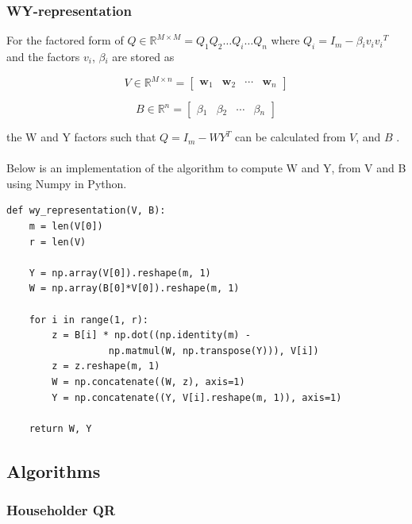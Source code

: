 \documentclass{article}
\begin{document}
\subsubsection{WY-representation}

For the factored form of $Q \in \mathbb{R}^{M \times M} = {Q_1}{Q_2}{\dots}{Q_i}{\dots}{Q_n}$ where $Q_i = {I_m} - {\beta{}_i}{v_i}{v_i}^T$ and the factors ${v_i}$, ${\beta{}_i}$ are stored as  

\begin{equation}
V \in \mathbb{R}^{M \times n} =
\begin{bmatrix}
\mathbf{w}_1 & \mathbf{w}_2 & \cdots & \mathbf{w}_{n}
\end{bmatrix}
\end{equation}

\begin{equation}
B \in \mathbb{R}^{n} = 
\begin{bmatrix}
\beta{}_1 & \beta{}_2 & \cdots & \beta{}_{n}
\end{bmatrix}
\end{equation}

 the W and Y factors such that $Q = I_m - {W}{Y}^T$ can be calculated from $V$, and $B$ \cite{golub} \cite{doi:10.1137/19M1296367}.

\paragraph{}
Below is an implementation of the algorithm to compute W and Y, from V and B using Numpy in Python.

\begin{lstlisting}
def wy_representation(V, B):
    m = len(V[0])
    r = len(V)

    Y = np.array(V[0]).reshape(m, 1)
    W = np.array(B[0]*V[0]).reshape(m, 1)

    for i in range(1, r):
        z = B[i] * np.dot((np.identity(m) - 
			      np.matmul(W, np.transpose(Y))), V[i])
        z = z.reshape(m, 1)
        W = np.concatenate((W, z), axis=1)
        Y = np.concatenate((Y, V[i].reshape(m, 1)), axis=1)
    
    return W, Y
\end{lstlisting}

\subsection{Algorithms}
\subsubsection{Householder QR}
\end{document}
